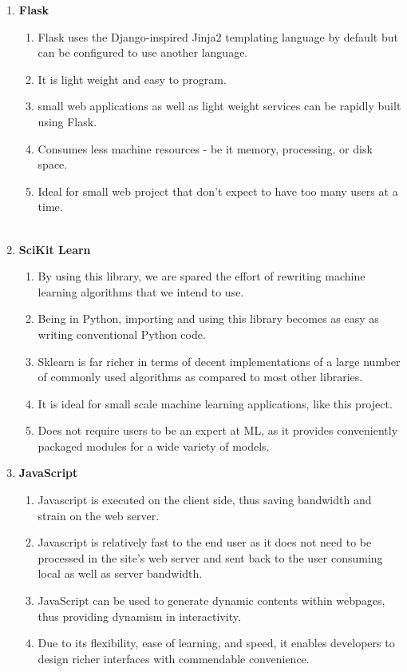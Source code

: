 \begin{enumerate}
\item \textbf{Flask}
	\begin{enumerate}
	\item[] Flask uses the Django-inspired Jinja2 templating language by default but can be configured to use another language.
	\item[] It is light weight and easy to program.
	\item[] small web applications as well as light weight services can be rapidly built using Flask.
	\item[] Consumes less machine resources - be it memory, processing, or disk space.
	\item[] Ideal for small web project that don't expect to have too many users at a time. \\\\
	\end{enumerate}

\item \textbf{SciKit Learn}
	\begin{enumerate}
	\item[] By using this library, we are spared the effort of rewriting machine learning algorithms that we intend to use.
	\item[] Being in Python, importing and using this library becomes as easy as writing conventional Python code.
	\item[] Sklearn is far richer in terms of decent implementations of a large number of commonly used algorithms as compared to most other libraries.
	\item[] It is ideal for small scale machine learning applications, like this project.
	\item[] Does not require users to be an expert at ML, as it provides conveniently packaged modules for a wide variety of models.
	\end{enumerate}

\item \textbf{JavaScript}
	\begin{enumerate}
	\item[] Javascript is executed on the client side, thus saving bandwidth and strain on the web server.
	\item[] Javascript is relatively fast to the end user as it does not need to be processed in the site's web server and sent back to the user consuming local as well as server bandwidth.
	\item[] JavaScript can be used to generate dynamic contents within webpages, thus providing dynamism in interactivity.
	\item[] Due to its flexibility, ease of learning, and speed, it enables developers to design richer interfaces with commendable convenience.
	\end{enumerate}


\end{enumerate}
